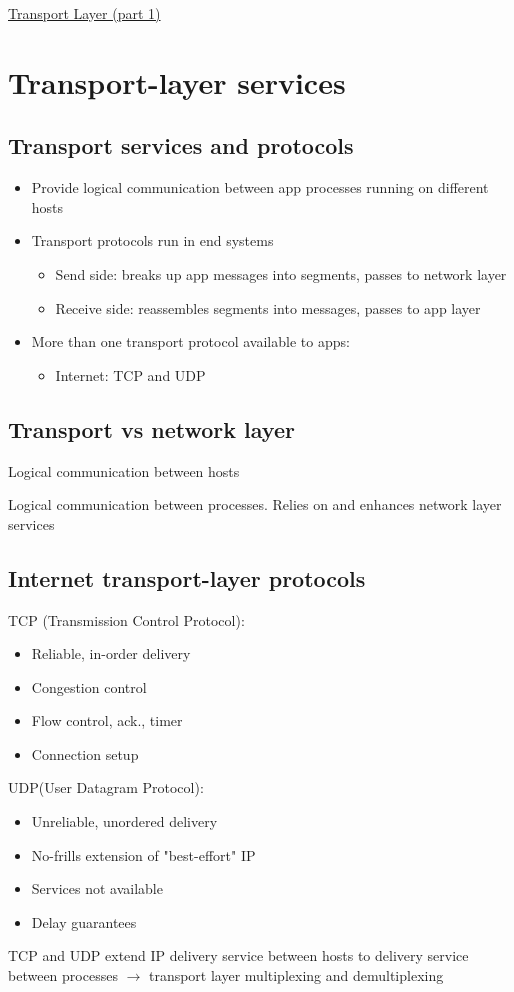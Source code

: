 \documentclass{article}[18pt]
\begin{document}
\begin{center}
\underline{\huge Transport Layer (part 1)}
\end{center}
\section{Transport-layer services}
\subsection{Transport services and protocols}
\begin{itemize}
	\item Provide logical communication between app processes running on different hosts
	\item Transport protocols run in end systems
	\begin{itemize}
		\item Send side: breaks up app messages into segments, passes to network layer
		\item Receive side: reassembles segments into messages, passes to app layer
	\end{itemize}
	\item More than one transport protocol available to apps:
	\begin{itemize}
		\item Internet: TCP and UDP
	\end{itemize}
\end{itemize}
\subsection{Transport vs network layer}
\begin{defin}
Logical communication between hosts
\end{defin}
\begin{defin}
Logical communication between processes. Relies on and enhances network layer services
\end{defin}
\subsection{Internet transport-layer protocols}
TCP (Transmission Control Protocol):
\begin{itemize}
	\item Reliable, in-order delivery
	\item Congestion control
	\item Flow control, ack., timer
	\item Connection setup
\end{itemize}
UDP(User Datagram Protocol):
\begin{itemize}
	\item Unreliable, unordered delivery
	\item No-frills extension of "best-effort" IP
	\item Services not available
	\item Delay guarantees
\end{itemize}
TCP and UDP extend IP delivery service between hosts to delivery service between processes $\rightarrow$ transport layer multiplexing and demultiplexing
\end{document}

